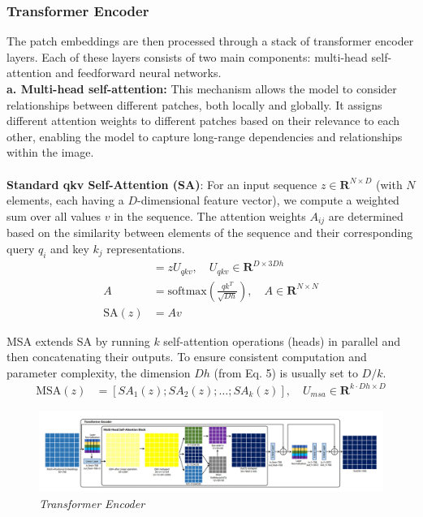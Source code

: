 \subsubsection{Transformer Encoder}
The patch embeddings are then processed through a stack of transformer encoder layers. Each of these layers consists of two main components: multi-head self-attention and feedforward neural networks.
\\


\noindent \textbf{a. Multi-head self-attention:} This mechanism allows the model to consider relationships between different patches, both locally and globally. It assigns different attention weights to different patches based on their relevance to each other, enabling the model to capture long-range dependencies and relationships within the image. \\
\\
\noindent \textbf{Standard qkv Self-Attention (SA)}:
For an input sequence $z \in \mathbf{R}^{N \times D}$ (with $N$ elements, each having a $D$-dimensional feature vector), we compute a weighted sum over all values $v$ in the sequence. The attention weights $A_{ij}$ are determined based on the similarity between elements of the sequence and their corresponding query $q_i$ and key $k_j$ representations.
\begin{align}
    [q, k, v]    & = zU_{qkv}, \quad U_{qkv} \in \mathbf{R}^{D \times 3Dh} \label{eq:qkv}                                               \\
    A            & = \text{softmax}\left(\frac{qk^T}{\sqrt{Dh}}\right), \quad A \in \mathbf{R}^{N \times N} \label{eq:attentionweights} \\
    \text{SA}(z) & = Av \label{eq:selfattention}
\end{align}

MSA extends SA by running $k$ self-attention operations (heads) in parallel and then concatenating their outputs. To ensure consistent computation and parameter complexity, the dimension $Dh$ (from Eq. 5) is usually set to $D/k$.
\begin{align}
    \text{MSA}(z) & = [SA_1(z); SA_2(z); \ldots ; SA_k(z)], \quad U_{msa} \in \mathbf{R}^{k \cdot Dh \times D} \label{eq:multiheadselfattention}
\end{align}

\begin{figure}[htbp]
    \centering
    \includegraphics[width=6in]{img/encoderdetails.jpg}
    \caption{\textit{Transformer Encoder}}
\end{figure}


